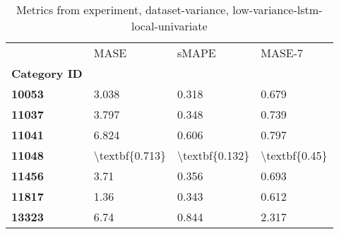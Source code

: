 \begin{table}[h]
\centering
\caption{Metrics from experiment, dataset-variance, low-variance-lstm-local-univariate}
\label{table:low-variance-lstm-local-univariate-dataset-variance}
\begin{tabular}{llll}
\toprule
{} &            MASE &           sMAPE &         MASE-7 \\
\textbf{Category ID} &                 &                 &                \\
\midrule
\textbf{10053      } &           3.038 &           0.318 &          0.679 \\
\textbf{11037      } &           3.797 &           0.348 &          0.739 \\
\textbf{11041      } &           6.824 &           0.606 &          0.797 \\
\textbf{11048      } &  \textbackslash textbf\{0.713\} &  \textbackslash textbf\{0.132\} &  \textbackslash textbf\{0.45\} \\
\textbf{11456      } &            3.71 &           0.356 &          0.693 \\
\textbf{11817      } &            1.36 &           0.343 &          0.612 \\
\textbf{13323      } &            6.74 &           0.844 &          2.317 \\
\bottomrule
\end{tabular}
\end{table}
